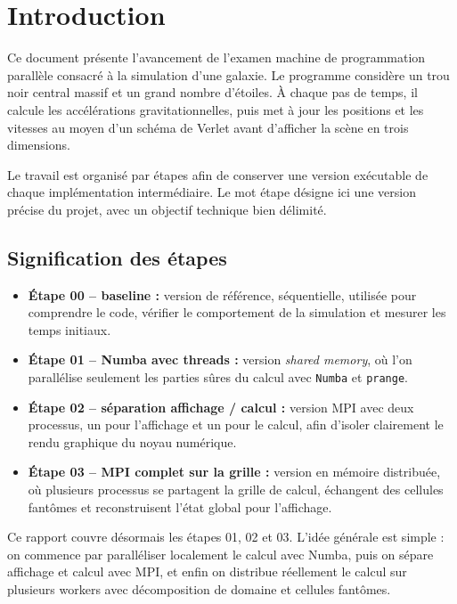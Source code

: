 \section{Introduction}

Ce document présente l'avancement de l'examen machine de programmation parallèle consacré à la simulation d'une galaxie. Le programme considère un trou noir central massif et un grand nombre d'étoiles. À chaque pas de temps, il calcule les accélérations gravitationnelles, puis met à jour les positions et les vitesses au moyen d'un schéma de Verlet avant d'afficher la scène en trois dimensions.

Le travail est organisé par étapes afin de conserver une version exécutable de chaque implémentation intermédiaire. Le mot \og étape \fg{} désigne ici une version précise du projet, avec un objectif technique bien délimité.

\subsection{Signification des étapes}

\begin{itemize}
    \item \textbf{Étape 00 -- baseline :} version de référence, séquentielle, utilisée pour comprendre le code, vérifier le comportement de la simulation et mesurer les temps initiaux.
    \item \textbf{Étape 01 -- Numba avec threads :} version \textit{shared memory}, où l'on parallélise seulement les parties sûres du calcul avec \texttt{Numba} et \texttt{prange}.
    \item \textbf{Étape 02 -- séparation affichage / calcul :} version MPI avec deux processus, un pour l'affichage et un pour le calcul, afin d'isoler clairement le rendu graphique du noyau numérique.
    \item \textbf{Étape 03 -- MPI complet sur la grille :} version en mémoire distribuée, où plusieurs processus se partagent la grille de calcul, échangent des cellules fantômes et reconstruisent l'état global pour l'affichage.
\end{itemize}

Ce rapport couvre désormais les étapes 01, 02 et 03. L'idée générale est simple : on commence par paralléliser localement le calcul avec Numba, puis on sépare affichage et calcul avec MPI, et enfin on distribue réellement le calcul sur plusieurs workers avec décomposition de domaine et cellules fantômes.
